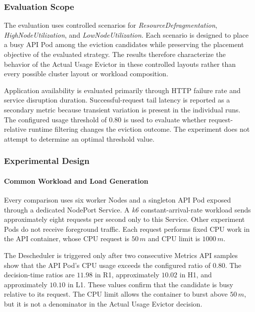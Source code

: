 \subsubsection{Evaluation Scope}
\label{subsec:actualusage4_scope}
The evaluation uses controlled scenarios for \textit{ResourceDefragmentation}, \textit{HighNodeUtilization}, and \textit{LowNodeUtilization}. Each scenario is designed to place a busy API Pod among the eviction candidates while preserving the placement objective of the evaluated strategy. The results therefore characterize the behavior of the Actual Usage Evictor in these controlled layouts rather than every possible cluster layout or workload composition.

Application availability is evaluated primarily through HTTP failure rate and service disruption duration. Successful-request tail latency is reported as a secondary metric because transient variation is present in the individual runs. The configured usage threshold of \(0.80\) is used to evaluate whether request-relative runtime filtering changes the eviction outcome. The experiment does not attempt to determine an optimal threshold value.

\subsubsection{Experimental Design}
\label{subsec:actualusage4_experimentsetup}
\paragraph{Common Workload and Load Generation}
\label{subsubsec:actualusage4_load}

Every comparison uses six worker Nodes and a singleton API Pod exposed through a dedicated NodePort Service. A \textit{k6} constant-arrival-rate workload sends approximately eight requests per second only to this Service. Other experiment Pods do not receive foreground traffic. Each request performs fixed CPU work in the API container, whose CPU request is \(50\,m\) and CPU limit is \(1000\,m\).

The Descheduler is triggered only after two consecutive Metrics API samples show that the API Pod's CPU usage exceeds the configured ratio of \(0.80\). The decision-time ratios are \(11.98\) in R1, approximately \(10.02\) in H1, and approximately \(10.10\) in L1. These values confirm that the candidate is busy relative to its request. The CPU limit allows the container to burst above \(50\,m\), but it is not a denominator in the Actual Usage Evictor decision.

